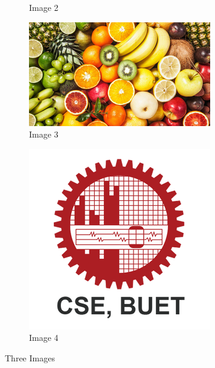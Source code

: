 \documentclass[twocolumn]{article}
\begin{document}
\begin{figure}[htbp]
\begin{subfigure}{0.4\columnwidth}
         \caption{Image 2}
         \label{fig:2}
     \end{subfigure}
     \hfill
     \begin{subfigure}{0.6\columnwidth}
         \centering
         \includegraphics[width=\columnwidth]{Images/Fruits.png}
         \caption{Image 3}
         \label{fig:3}
     \end{subfigure}
     \hfill
     \begin{subfigure}{0.3\columnwidth}
         \centering
         \includegraphics[width=\columnwidth]{Images/CSE_BUET.png}
         \caption{Image 4}
         \label{fig:4}
     \end{subfigure}
     
        \caption{Three Images}
        \label{fig:4 graphs}
\end{figure}
\end{document}
